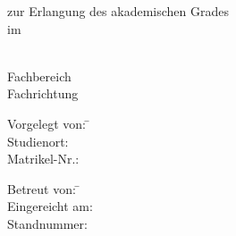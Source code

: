 \begin{titlepage}

\begin{minipage}{\textwidth}
		\noindent \hfill 
\end{minipage}
\vspace{4em}

\begin{center}
    {\huge \art}

    {\Large zur Erlangung des akademischen Grades \akadGrad}\\
    {\Large im \studiengang}

    \vspace{4em}

    \textbf{{\Large \titel}}

    \vspace{4em}

    \hochschule \\
    Fachbereich \fachbereich \\
    Fachrichtung \fachrichtung

    \vspace{12em}

	\begin{multicols}{2}
	\begin{minipage}{\textwidth}
		\begin{tabbing}

		Vorgelegt von:  \hspace*{0.5em}\= \autor \\
		Studienort: \> \ort \\
        Matrikel-Nr.: \> \matrikelnr
        \end{tabbing}
    \end{minipage}
        
	\begin{minipage}{\textwidth}
		\begin{tabbing}
		 
        Betreut von: \hspace*{1.5em}\= \betreuer \\
        Eingereicht am: \> \datumAbgabe \\
        Standnummer: \> \standnummer
		\end{tabbing}

	\end{minipage}
	\end{multicols}
\end{center}
\end{titlepage}
